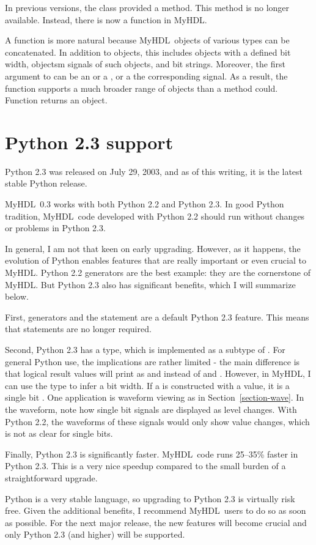 \documentclass{howto}
\newcommand{\myhdl}{\protect \mbox{MyHDL}}
\begin{document}
In previous versions, the  class provided a
 method.  This method is no longer
available. Instead, there is now a  function
in \myhdl{}.

A function is more natural because \myhdl\ objects of various types
can be concatenated.  In addition to  objects, this
includes objects with a defined bit width,  objectsm
signals of such objects, and bit strings. Moreover, the first argument
to  can be an  or a , or a
the corresponding signal. As a result, the 
function supports a much broader range of objects than a method could.
Function  returns an  object.


\section{Python 2.3 support\label{section-Python}}

Python 2.3 was released on July 29, 2003, and as of this writing, it
is the latest stable Python release.

\myhdl\ 0.3 works with both Python 2.2 and Python 2.3. In good Python
tradition, \myhdl\ code developed with Python 2.2 should run without
changes or problems in Python 2.3.

In general, I am not that keen on early upgrading. However, as it
happens, the evolution of Python enables features that are really
important or even crucial to \myhdl{}.  Python 2.2 generators are the
best example: they are the cornerstone of \myhdl{}. But Python 2.3
also has significant benefits, which I will summarize below.

First, generators and the  statement are a default Python
2.3 feature. This means that 
statements are no longer required.

Second, Python 2.3 has a  type, which is implemented as a
subtype of . For general Python use, the implications are
rather limited - the main difference is that logical result values
will print as  and  instead of  and
. However, in \myhdl{}, I can use the  type to
infer a bit width.  If a  is constructed with a
 value, it is a single bit . One application
is waveform viewing as in Section~\ref{section-wave}. In the waveform,
note how single bit signals are displayed as level changes.  With
Python 2.2, the waveforms of these signals would only show value
changes, which is not as clear for single bits.

Finally, Python 2.3 is significantly faster. \myhdl\ code runs
25--35\% faster in Python 2.3. This is a very nice speedup compared to
the small burden of a straightforward upgrade.

Python is a very stable language, so upgrading to Python 2.3 is
virtually risk free. Given the additional benefits, I recommend
\myhdl\ users to do so as soon as possible. For the next major
release, the new features will become crucial and only Python 2.3 (and
higher) will be supported.
\end{document}
